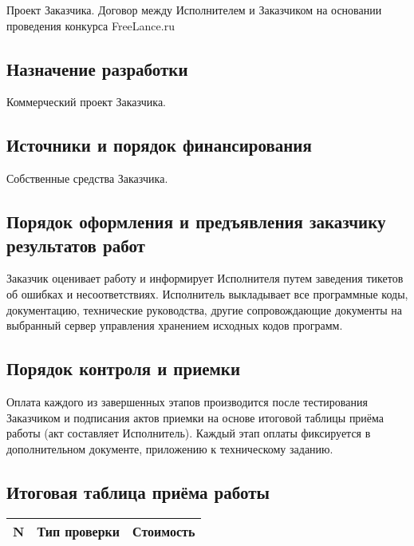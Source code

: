 Проект Заказчика. Договор между Исполнителем и Заказчиком на основании проведения конкурса
Free\-Lance.ru

\subsection{Назначение разработки}

Коммерческий проект Заказчика.

\subsection{Источники и порядок финансирования}

Собственные средства Заказчика.

\subsection{Порядок оформления и предъявления заказчику результатов работ}

Заказчик оценивает работу и информирует Исполнителя путем заведения тикетов об ошибках и
несоответствиях. Исполнитель выкладывает все программные коды, документацию, технические
руководства, другие сопровождающие документы на выбранный сервер управления хранением исходных кодов
программ.

\subsection{Порядок контроля и приемки}

Оплата каждого из завершенных этапов производится после тестирования Заказчиком и подписания актов
приемки на основе итоговой таблицы приёма работы (акт составляет Исполнитель). Каждый этап оплаты
фиксируется в дополнительном документе, приложению к техническому заданию.

\subsection{Итоговая таблица приёма работы}

\begin{table}
\begin{center}
\noindent\begin{tabularx}{\linewidth}{|c|X|c|}

		\hline

		\textbf{N} & \textbf{Тип проверки} & \textbf{Стоимость} \\

		\hline

\end{tabularx}
\end{center}
\end{table}



